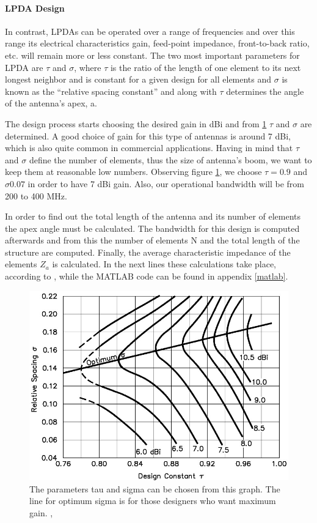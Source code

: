 \paragraph{LPDA Design}
In contrast, LPDAs can be operated over a range of frequencies and over this range its electrical characteristics gain, feed-point impedance, front-to-back ratio, etc. will remain more or less constant. The two most important parameters for LPDA are $\tau$ and $\sigma$, where $\tau$ is the ratio of the length of one element to its next longest neighbor and is constant for a given design for all elements and $\sigma$ is known as the “relative spacing constant” and along with $\tau$ determines the angle of the antenna’s apex, a. 

The design process starts choosing the desired gain in dBi and from \ref{log_gain} $\tau$ and $\sigma$ are determined. A good choice of gain for this type of antennas is around 7 dBi, which is also quite common in commercial applications. Having in mind that $\tau$ and $\sigma$ define the number of elements, thus the size of antenna's boom, we want to keep them at reasonable low numbers. Observing figure \ref{log_gain}, we choose $\tau=0.9$ and $\sigma0.07$ in order to have 7 dBi gain. Also, our operational bandwidth will be from 200 to 400 MHz.

In order to find out the total length of the antenna and its number of elements the apex angle must be calculated. The bandwidth for this design is computed afterwards and from this the number of elements N and the total length of the structure are computed. Finally, the average characteristic impedance of the elements $Z_{a}$ is calculated. In the next lines these calculations take place, according to \cite{balanis}, while the MATLAB code can be found in appendix \ref{matlab}.

\begin{figure}[ht]
\centering
\includegraphics[width=1\textwidth]{figures/Yannis/Log_gain}
\caption{The parameters tau and sigma can be chosen from this graph. The line for optimum sigma is for those designers who want maximum gain. \cite{Log}, \cite{balanis}}
\label{log_gain}
\end{figure}

